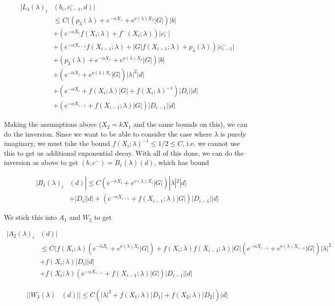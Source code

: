 \documentclass[12pt]{article}
\begin{document}
\begin{enumerate}
\begin{align*}
|L_4(\lambda)_i&(b_i, c_{i-1}^-, d)| \\
&\leq C ((p_3(\lambda) + e^{-\alpha X_1} + e^{\nu(\lambda)X_2} |G| )|b| \\
&+ (e^{-\alpha X_i} f(X_i; \lambda) + f^-(X_i; \lambda))|c_i^-| \\
&+ (e^{-\alpha X_{i-1}} f(X_{i-1}; \lambda) + |G| f(X_{i-1}; \lambda) + p_4(\lambda)) |c_{i-1}^-| \\
&+ (p_3(\lambda) + e^{-\alpha X_1} + e^{\nu(\lambda)X_2} |G| )|b| \\
&+ (e^{-\tilde{\alpha}X_i} + e^{\nu(\lambda) X_i}|G| )|\lambda|^2 |d| \\
&+ (e^{-\alpha X_i} + f(X_i; \lambda) |G| + f(X_i; \lambda)^{-1} )|D_i| |d| \\
&+ (e^{-\alpha X_{i-1}} + f(X_{i-1}; \lambda) |G|)|D_{i-1}||d|
\end{align*}

Making the assumptions above ($X_2 = k X_1$ and the same bounds on this), we can do the inversion. Since we want to be able to consider the case where $\lambda$ is purely imaginary, we must take the bound $f(X_i; \lambda)^{-1} \leq 1/2 \leq C$, i.e. we cannot use this to get us additional exponential decay. With all of this done, we can do the inversion as above to get $(b, c^-) = B_1(\lambda)(d)$, which has bound

\begin{align*}
|B_1(\lambda)_i&(d)| \leq C (e^{-\tilde{\alpha}X_i} + e^{\nu(\lambda) X_i}|G| )|\lambda|^2 |d| \\
&+ |D_i| |d| + (e^{-\alpha X_{i-1}} + f(X_{i-1}; \lambda) |G|)|D_{i-1}||d|
\end{align*}

We stick this into $A_1$ and $W_2$ to get

\begin{align*}
|A_2(\lambda)_i&(d)| \\
&\leq C ( f(X_i; \lambda)(e^{-\tilde{\alpha}X_i} + e^{\nu(\lambda) X_i}|G| )
+ f(X_i; \lambda)f(X_{i-1}; \lambda)|G|(e^{-\tilde{\alpha}X_{i-1}} + e^{\nu(\lambda) X_{i-1}}|G|)|\lambda|^2 \\
&+ f(X_i; \lambda) |D_i| |d| \\
&+ f(X_i; \lambda)(e^{-\alpha X_{i-1}} + f(X_{i-1}; \lambda)|G| )|D_{i-1}||d|
\end{align*}

\begin{align*}
||W_3(\lambda)&(d)|| \leq C (|\lambda|^2 + f(X_1; \lambda)|D_1| + f(X_2; \lambda)|D_2|)|d|
\end{align*}


\end{enumerate}
\end{document}
